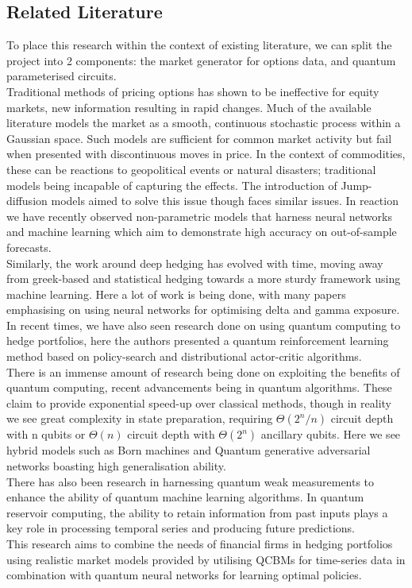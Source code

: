 \documentclass{article}
\numberwithin{equation}{section}
\begin{document}
\begin{Abstract}
\section{Related Literature}
To place this research within the context of existing literature, we can split 
the project into 2 components: the market generator for options data, 
and quantum parameterised circuits.\\ 
Traditional methods of pricing options has shown to be ineffective for equity 
markets, new information resulting in rapid changes. Much of the available 
literature models the market as a smooth, continuous stochastic process within 
a Gaussian space. Such models are sufficient for common market activity but fail 
when presented with discontinuous moves in price. In the context of commodities, 
these can be reactions to geopolitical events or natural disasters; traditional
models being incapable of capturing the effects. The introduction of Jump- diffusion 
models aimed to solve this issue though faces similar issues. In reaction we have 
recently observed non-parametric models that harness neural networks and machine 
learning which aim to demonstrate high accuracy on out-of-sample forecasts.\\
Similarly, the work around deep hedging has evolved with time, moving away from 
greek-based and statistical hedging towards a more sturdy framework using machine 
learning. Here a lot of work is being done, with many papers emphasising on using 
neural networks for optimising delta and gamma exposure. In recent times, we have 
also seen research done on using quantum computing to hedge portfolios, here the 
authors presented a quantum reinforcement learning method based on policy-search 
and distributional actor-critic algorithms.\\
There is an immense amount of research being done on exploiting the benefits of 
quantum computing, recent advancements being in quantum algorithms. 
These claim to provide exponential speed-up over classical 
methods, though in reality we see great complexity in state preparation, requiring 
$\Theta(2^n/n)$ circuit depth with n qubits or $\Theta(n)$ circuit depth with 
$\Theta(2^n)$ ancillary qubits. Here we see hybrid models such as Born machines
and Quantum generative adversarial networks boasting high generalisation ability. 
\\
There has also been research in harnessing quantum weak measurements to enhance 
the ability of quantum machine learning algorithms. In quantum reservoir computing,
the ability to retain information from past inputs plays a key role in processing 
temporal series and producing future predictions.  
\\
This research aims to combine the needs of financial firms in hedging portfolios
using realistic market models provided by utilising QCBMs for time-series data 
in combination with quantum neural networks for learning optimal policies. 


\end{Abstract}
\end{document}
